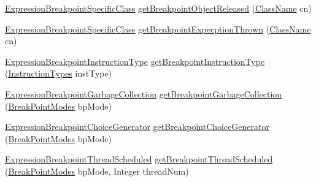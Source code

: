 \begin{DoxyCompactItemize}
\item 
\hyperlink{classgov_1_1nasa_1_1jpf_1_1inspector_1_1server_1_1expression_1_1expressions_1_1_expression_breakpoint_specific_class}{Expression\+Breakpoint\+Specific\+Class} \hyperlink{classgov_1_1nasa_1_1jpf_1_1inspector_1_1server_1_1expression_1_1_expression_factory_a127870e4c9f54cbdf5a9982c428fddea}{get\+Breakpoint\+Object\+Released} (\hyperlink{classgov_1_1nasa_1_1jpf_1_1inspector_1_1utils_1_1expressions_1_1_class_name}{Class\+Name} cn)
\item 
\hyperlink{classgov_1_1nasa_1_1jpf_1_1inspector_1_1server_1_1expression_1_1expressions_1_1_expression_breakpoint_specific_class}{Expression\+Breakpoint\+Specific\+Class} \hyperlink{classgov_1_1nasa_1_1jpf_1_1inspector_1_1server_1_1expression_1_1_expression_factory_a77487b13614f4e14543194d0c81ed038}{get\+Breakpoint\+Expecption\+Thrown} (\hyperlink{classgov_1_1nasa_1_1jpf_1_1inspector_1_1utils_1_1expressions_1_1_class_name}{Class\+Name} cn)
\item 
\hyperlink{classgov_1_1nasa_1_1jpf_1_1inspector_1_1server_1_1expression_1_1expressions_1_1_expression_breakpoint_instruction_type}{Expression\+Breakpoint\+Instruction\+Type} \hyperlink{classgov_1_1nasa_1_1jpf_1_1inspector_1_1server_1_1expression_1_1_expression_factory_a12400a7b6d1e60800ef65c13846ad473}{get\+Breakpoint\+Instruction\+Type} (\hyperlink{enumgov_1_1nasa_1_1jpf_1_1inspector_1_1interfaces_1_1_instruction_types}{Instruction\+Types} inst\+Type)
\item 
\hyperlink{classgov_1_1nasa_1_1jpf_1_1inspector_1_1server_1_1expression_1_1expressions_1_1_expression_breakpoint_garbage_collection}{Expression\+Breakpoint\+Garbage\+Collection} \hyperlink{classgov_1_1nasa_1_1jpf_1_1inspector_1_1server_1_1expression_1_1_expression_factory_ae6ebe4637242273883945e5896e05f10}{get\+Breakpoint\+Garbage\+Collection} (\hyperlink{enumgov_1_1nasa_1_1jpf_1_1inspector_1_1server_1_1breakpoints_1_1_break_point_modes}{Break\+Point\+Modes} bp\+Mode)
\item 
\hyperlink{classgov_1_1nasa_1_1jpf_1_1inspector_1_1server_1_1expression_1_1expressions_1_1_expression_breakpoint_choice_generator}{Expression\+Breakpoint\+Choice\+Generator} \hyperlink{classgov_1_1nasa_1_1jpf_1_1inspector_1_1server_1_1expression_1_1_expression_factory_a151248b5d27763a9f479b43bfd0e447d}{get\+Breakpoint\+Choice\+Generator} (\hyperlink{enumgov_1_1nasa_1_1jpf_1_1inspector_1_1server_1_1breakpoints_1_1_break_point_modes}{Break\+Point\+Modes} bp\+Mode)
\item 
\hyperlink{classgov_1_1nasa_1_1jpf_1_1inspector_1_1server_1_1expression_1_1expressions_1_1_expression_breakpoint_thread_scheduled}{Expression\+Breakpoint\+Thread\+Scheduled} \hyperlink{classgov_1_1nasa_1_1jpf_1_1inspector_1_1server_1_1expression_1_1_expression_factory_a0513105481311bad2db8f17e8619bbd1}{get\+Breakpoint\+Thread\+Scheduled} (\hyperlink{enumgov_1_1nasa_1_1jpf_1_1inspector_1_1server_1_1breakpoints_1_1_break_point_modes}{Break\+Point\+Modes} bp\+Mode, Integer thread\+Num)

\end{DoxyCompactItemize}
